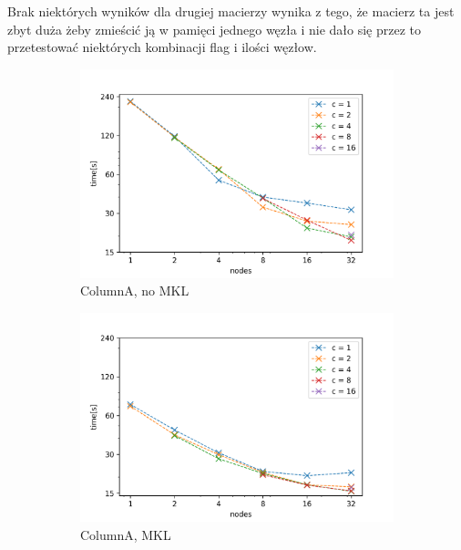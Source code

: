 \documentclass{article}
\begin{document}
Brak niektórych wyników dla drugiej macierzy wynika z tego, że macierz ta jest zbyt duża żeby zmieścić ją
w pamięci jednego węzła i nie dało się przez to przetestować niektórych kombinacji flag i ilości węzłow.

\begin{figure}[ht!]
    \centering
    \begin{subfigure}[b]{0.45\textwidth}
        \includegraphics[width=\textwidth]{charts/s_50000_1000_5}
        \caption{ColumnA, no MKL}
    \end{subfigure}
    \begin{subfigure}[b]{0.45\textwidth}
        \includegraphics[width=\textwidth]{charts/s_50000_1000_5_m}
        \caption{ColumnA, MKL}
    \end{subfigure}
    \begin{subfigure}[b]{0.45\textwidth}

\end{subfigure}
\end{figure}
\end{document}
